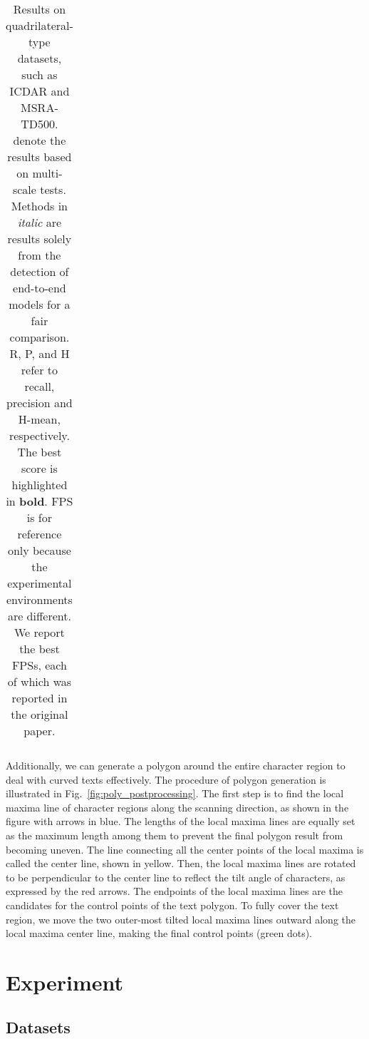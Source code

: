 \documentclass[10pt,twocolumn,letterpaper]{article}
\begin{document}
\begin{table*}[t!]
\begin{tabular}{c||c|c|c||c|c|c||c|c|c||c|c|c||c}
    \hline
  \end{tabular}
  \vspace{3mm}
  \caption{Results on quadrilateral-type datasets, such as ICDAR and MSRA-TD500.  denote the results based on multi-scale tests. Methods in \textit{italic} are results solely from the detection of end-to-end models for a fair comparison. R, P, and H refer to recall, precision and H-mean, respectively. The best score is highlighted in \textbf{bold}. FPS is for reference only because the experimental environments are different. We report the best FPSs, each of which was reported in the original paper.}
  \label{tab:result_icdar}
\end{table*}


















Additionally, we can generate a polygon around the entire character region to deal with curved texts effectively. The procedure of polygon generation is illustrated in Fig.~\ref{fig:poly_postprocessing}. 
The first step is to find the local maxima line of character regions along the scanning direction, as shown in the figure with arrows in blue. The lengths of the local maxima lines are equally set as the maximum length among them to prevent the final polygon result from becoming uneven. The line connecting all the center points of the local maxima is called the center line, shown in yellow. Then, the local maxima lines are rotated to be perpendicular to the center line to reflect the tilt angle of characters, as expressed by the red arrows. The endpoints of the local maxima lines are the candidates for the control points of the text polygon. To fully cover the text region, we move the two outer-most tilted local maxima lines outward along the local maxima center line, making the final control points (green dots).

 \section{Experiment}


\subsection{Datasets}
\end{document}
